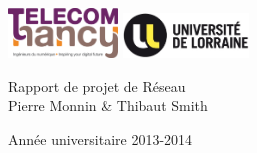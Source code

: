 \begin{titlepage}
\includegraphics[height=50px]{Logo_TN.jpg}
\hfill
\includegraphics[height=45px]{Logo_UL.jpg}
	
\vfill

\begin{center}
	\Huge{Rapport de projet de Réseau} \\
	\vspace{3mm}
	\LARGE{Pierre Monnin \& Thibaut Smith} \\
\end{center}

\vfill

\begin{flushright}
	Année universitaire 2013-2014
\end{flushright}

\end{titlepage}